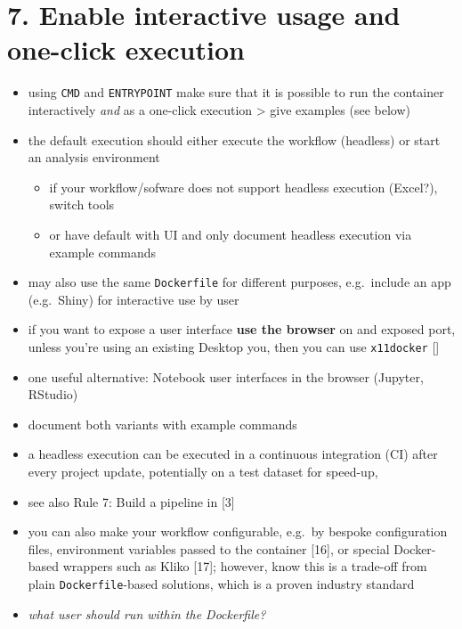 \documentclass[10pt,letterpaper]{article}
\providecommand{\tightlist}{%
  \setlength{\itemsep}{0pt}\setlength{\parskip}{0pt}}
\begin{document}
\hypertarget{enable-interactive-usage-and-one-click-execution}{%
\section*{7. Enable interactive usage and one-click
execution}\label{enable-interactive-usage-and-one-click-execution}}

\begin{itemize}
\tightlist
\item
  using \texttt{CMD} and \texttt{ENTRYPOINT} make sure that it is
  possible to run the container interactively \emph{and} as a one-click
  execution \textgreater{} give examples (see below)
\item
  the default execution should either execute the workflow (headless) or
  start an analysis environment

  \begin{itemize}
  \tightlist
  \item
    if your workflow/sofware does not support headless execution
    (Excel?), switch tools
  \item
    or have default with UI and only document headless execution via
    example commands
  \end{itemize}
\item
  may also use the same \texttt{Dockerfile} for different purposes,
  e.g.~include an app (e.g.~Shiny) for interactive use by user
\item
  if you want to expose a user interface \textbf{use the browser} on and
  exposed port, unless you're using an existing Desktop you, then you
  can use \texttt{x11docker} {[}{]}
\item
  one useful alternative: Notebook user interfaces in the browser
  (Jupyter, RStudio)
\item
  document both variants with example commands
\item
  a headless execution can be executed in a continuous integration (CI)
  after every project update, potentially on a test dataset for
  speed-up,
\item
  see also Rule 7: Build a pipeline in {[}3{]}
\item
  you can also make your workflow configurable, e.g.~by bespoke
  configuration files, environment variables passed to the container
  {[}16{]}, or special Docker-based wrappers such as Kliko {[}17{]};
  however, know this is a trade-off from plain \texttt{Dockerfile}-based
  solutions, which is a proven industry standard
\item
  \emph{what user should run within the Dockerfile?}
\end{itemize}
\end{document}
